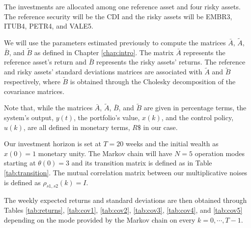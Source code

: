 The investments are allocated among one reference asset and four risky assets. The reference security will be the CDI and the risky assets will be EMBR3, ITUB4, PETR4, and VALE5.

We will use the parameters estimated previously to compute the matrices $\bar{A}$, $\tilde{A}$, $\bar{B}$, and $\tilde{B}$ as defined in Chapter \ref{chap:intro}. The matrix $\bar{A}$ represents the reference asset's return and $\bar{B}$ represents the risky assets' returns. The reference and risky assets' standard deviations matrices are associated with $\tilde{A}$ and $\tilde{B}$ respectively, where $\tilde{B}$ is obtained through the Cholesky decomposition of the covariance matrices.

Note that, while the matrices $\bar{A}$, $\tilde{A}$, $\bar{B}$, and $\tilde{B}$ are given in percentage terms, the system's output, $y(t)$, the portfolio's value, $x(k)$, and the control policy, $u(k)$, are all defined in monetary terms, $R\$$ in our case.

Our investment horizon is set at $T=20$ weeks and the initial wealth as $x(0) = 1$ monetary unity. The Markov chain will have $N=5$ operation modes starting at $\theta(0) = 3$ and its transition matrix is defined as in Table \ref{tab:transition}. The mutual correlation matrix between our multiplicative noises is defined as $\rho_{s1,s2}(k) = I$.

The weekly expected returns and standard deviations are then obtained through Tables \ref{tab:returns}, \ref{tab:cov1}, \ref{tab:cov2}, \ref{tab:cov3}, \ref{tab:cov4}, and \ref{tab:cov5} depending on the mode provided by the Markov chain on every $k=0, \cdots, T-1$.

